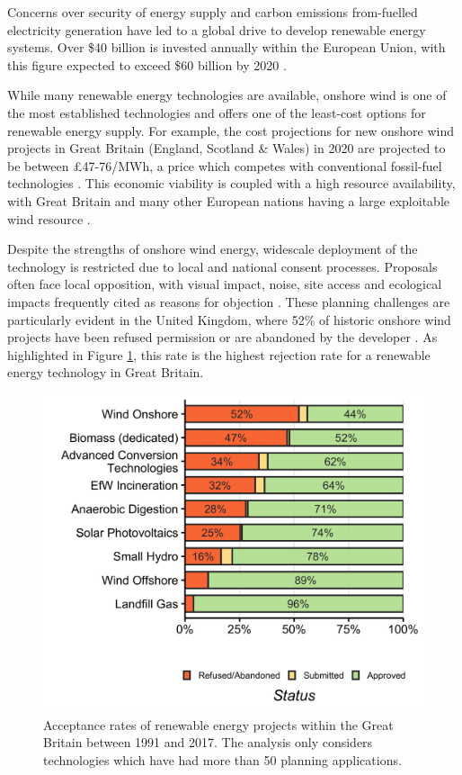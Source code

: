 \documentclass[a4paper,]{article}
\theoremstyle{definition}
\theoremstyle{definition}
\theoremstyle{definition}
\theoremstyle{remark}
\begin{document}
Concerns over security of energy supply and carbon emissions from-fuelled electricity generation have led to a global drive to develop renewable energy systems. Over \$40 billion is invested annually within the European Union, with this figure expected to exceed \$60 billion by 2020 \citep{UNEP2016}.

While many renewable energy technologies are available, onshore wind is one of the most established technologies and offers one of the least-cost options for renewable energy supply. For example, the cost projections for new onshore wind projects in Great Britain (England, Scotland \& Wales) in 2020 are projected to be between £47-76/MWh, a price which competes with conventional fossil-fuel technologies \citep{DBIES2016}. This economic viability is coupled with a high resource availability, with Great Britain and many other European nations having a large exploitable wind resource \citep{EuropeanEnvironmentAgency2009}.

Despite the strengths of onshore wind energy, widescale deployment of the technology is restricted due to local and national consent processes. Proposals often face local opposition, with visual impact, noise, site access and ecological impacts frequently cited as reasons for objection \citep{Wolsink2000, Langer2016}. These planning challenges are particularly evident in the United Kingdom, where 52\% of historic onshore wind projects have been refused permission or are abandoned by the developer \citep{DECC2018}. As highlighted in Figure \ref{fig:acceptanceRates}, this rate is the highest rejection rate for a renewable energy technology in Great Britain.



\begin{figure}[h]

{\centering \includegraphics[width=0.5\linewidth]{figures/figure1} 

}

\caption{Acceptance rates of renewable energy projects within the Great Britain between 1991 and 2017. The analysis only considers technologies which have had more than 50 planning applications.}\label{fig:acceptanceRates}
\end{figure}
\end{document}
